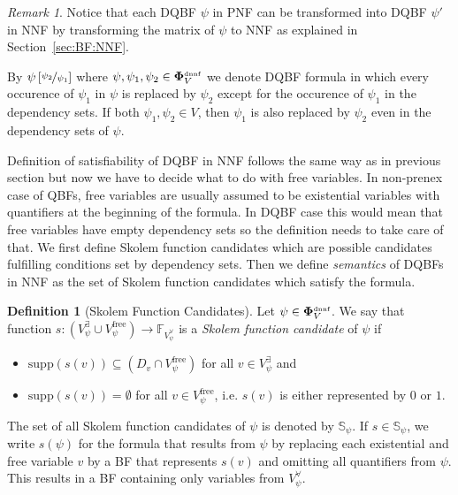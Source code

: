\documentclass[
  digital, %
  twoside, %
  table,   %
  nolof,     %
  nolot,     %
]{fithesis3}
\theoremstyle{definition}
\newtheorem{definition}{Definition}
\theoremstyle{remark}
\newtheorem*{remark}{Remark}
\newcommand{\substitute}[2]{\left[ \nicefrac{#2}{#1} \right]}
\newcommand{\DQBF}[1]{\mathbf{\Phi}_{#1}^{\text{\tiny dnnf}}}
\newcommand{\BFuncs}[1]{\mathbb{F}_{#1}}
\newcommand{\evars}[1]{V_{#1}^{\exists}}
\newcommand{\uvars}[1]{V_{#1}^{\forall}}
\newcommand{\fvars}[1]{V_{#1}^{\text{free}}}
\newcommand{\supp}[1]{\text{supp}(#1)}
\newcommand{\Scands}[1]{\mathbb{S}_{#1}}
\begin{document}
\begin{remark}
Notice that each DQBF $\psi$ in PNF can be transformed into DQBF $\psi'$ in NNF by transforming the matrix of $\psi$ to NNF as explained in Section~\ref{sec:BF:NNF}.
\end{remark}

By $\psi\substitute{\psi_1}{\psi_2}$ where $\psi, \psi_1, \psi_2 \in \DQBF{V}$ we denote DQBF formula in which every occurence of $\psi_1$ in $\psi$ is replaced by $\psi_2$ except for the occurence of $\psi_1$ in the dependency sets. If both $\psi_1, \psi_2 \in V$, then $\psi_1$ is also replaced by $\psi_2$ even in the dependency sets of $\psi$.

Definition of satisfiability of DQBF in NNF follows the same way as in previous section but now we have to decide what to do with free variables. In non-prenex case of QBFs, free variables are usually assumed to be existential variables with quantifiers at the beginning of the formula. In DQBF case this would mean that free variables have empty dependency sets so the definition needs to take care of that. We first define Skolem function candidates which are possible candidates fulfilling conditions set by dependency sets. Then we define \emph{semantics} of DQBFs in NNF as the set of Skolem function candidates which satisfy the formula. %



\begin{definition}[Skolem Function Candidates]
  Let $\psi \in \DQBF{V}$. We say that function $s\colon (\evars{\psi} \cup \fvars{\psi}) \to \BFuncs{\uvars{\psi}}$ is a \emph{Skolem function candidate} of $\psi$ if
  \begin{itemize}
      \item $\supp{s(v)} \subseteq (D_v \cap \fvars{\psi})$ for all $v \in \evars{\psi}$ and
      \item $\supp{s(v)} = \emptyset$ for all $v \in \fvars{\psi}$, i.e. $s(v)$ is either represented by $0$ or $1$.
  \end{itemize}
\end{definition}

The set of all Skolem function candidates of $\psi$ is denoted by $\Scands{\psi}$. If $s \in \Scands{\psi}$, we write $s(\psi)$ for the formula that results from $\psi$ by replacing each existential and free variable $v$ by a BF that represents $s(v)$ and omitting all quantifiers from $\psi$. This results in a BF containing only variables from $\uvars{\psi}$.
\end{document}
